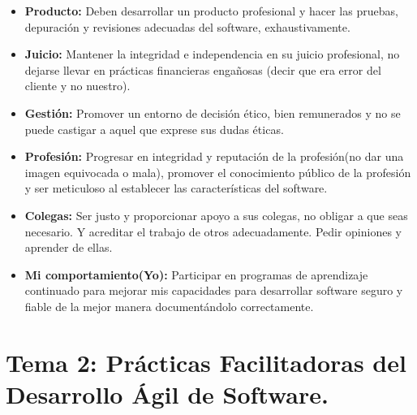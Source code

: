 \documentclass[12pt, twoside, openright]{report} %
\begin{document}
\begin{itemize}
\begin{itemize}
\begin{itemize}
    \item \textbf{Producto:} Deben desarrollar un producto profesional y
      hacer las pruebas, depuración y revisiones adecuadas del software,
      exhaustivamente.
      
    \item \textbf{Juicio:} Mantener la integridad e independencia en su
      juicio profesional, no dejarse llevar en prácticas financieras
      engañosas (decir que era error del cliente y no nuestro).
      
    \item \textbf{Gestión:} Promover un entorno de decisión ético, bien
      remunerados y no se puede castigar a aquel que exprese sus dudas
      éticas.
      
    \item \textbf{Profesión:} Progresar en integridad y reputación de la
      profesión(no dar una imagen equivocada o mala), promover el
      conocimiento público de la profesión y ser meticuloso al
      establecer las características del software.
      
    \item \textbf{Colegas:} Ser justo y proporcionar apoyo a sus colegas, no
      obligar a que seas necesario. Y acreditar el trabajo de otros
      adecuadamente. Pedir opiniones y aprender de ellas.
      
    \item \textbf{Mi comportamiento(Yo):} Participar en programas de
      aprendizaje continuado para mejorar mis capacidades para
      desarrollar software seguro y fiable de la mejor manera
      documentándolo correctamente.
      
    \end{itemize}
  \end{itemize}
\end{itemize}
\chapter{Tema 2: Prácticas Facilitadoras del Desarrollo Ágil de Software.}
\end{document}
